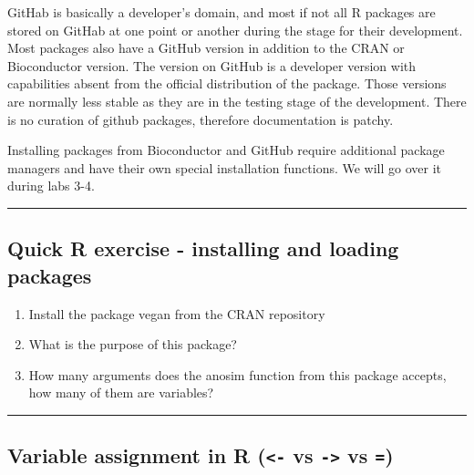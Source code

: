 \documentclass[
]{book}
\theoremstyle{definition}
\theoremstyle{definition}
\theoremstyle{definition}
\theoremstyle{definition}
\theoremstyle{remark}
\begin{document}
GitHab is basically a developer's domain, and most if not all R packages are stored on GitHab at one point or another
during the stage for their development. Most packages also have a GitHub version in addition to the CRAN or
Bioconductor version. The version on GitHub is a developer version with capabilities absent from the official
distribution of the package. Those versions are normally less stable as they are in the testing stage of the
development. There is no curation of github packages, therefore documentation is patchy.

Installing packages from Bioconductor and GitHub require additional package managers and have their own special
installation functions. We will go over it during labs 3-4.

\begin{center}\rule{0.5\linewidth}{0.5pt}\end{center}

\hypertarget{quick-r-exercise---installing-and-loading-packages}{%
\subsection*{\texorpdfstring{\textbf{Quick R exercise - installing and loading packages}}{Quick R exercise - installing and loading packages}}\label{quick-r-exercise---installing-and-loading-packages}}

\begin{enumerate}
\def\labelenumi{\arabic{enumi}.}
\item
  Install the package vegan from the CRAN repository
\item
  What is the purpose of this package?
\item
  How many arguments does the anosim function from this package accepts, how many of them are variables?
\end{enumerate}

\begin{center}\rule{0.5\linewidth}{0.5pt}\end{center}

\hypertarget{variable-assignment-in-r---vs---vs}{%
\subsection*{\texorpdfstring{\textbf{Variable assignment in R (\texttt{\textless{}-} vs \texttt{-\textgreater{}} vs \texttt{=})}}{Variable assignment in R (\textless- vs -\textgreater{} vs =)}}\label{variable-assignment-in-r---vs---vs}}
\end{document}
